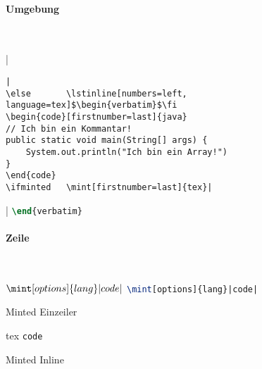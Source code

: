 \paragraph{Umgebung}~\\
\begin{listing}
\ifminted   {}|\begin{verbatim}|
\else       \lstinline[numbers=left, language=tex]$\begin{verbatim}$\fi
\begin{code}[firstnumber=last]{java}
// Ich bin ein Kommantar!
public static void main(String[] args) {
    System.out.println("Ich bin ein Array!")
}
\end{code}
\ifminted   \mint[firstnumber=last]{tex}|\end{verbatim}|
\else       \lstinline[firstnumber=last, numbers=left, language=tex]$\end{verbatim}$\fi
\caption{Minted Umgebung}
\label{lst:minted-env}
\end{listing}

\paragraph{Zeile}~\\
\begin{listing}
\ifminted   {}$\mint[options]{lang}|code|$
\else       \lstinline[language=tex]$\mint[options]{lang}|code|$\fi
\caption{Minted Einzeiler}
\label{lst:minted-line}
\end{listing}

\begin{listing}
\begin{code}{tex}
\texttt{code}
\end{code}
\caption{Minted Inline}
\label{lst:minted-inline}
\end{listing}
